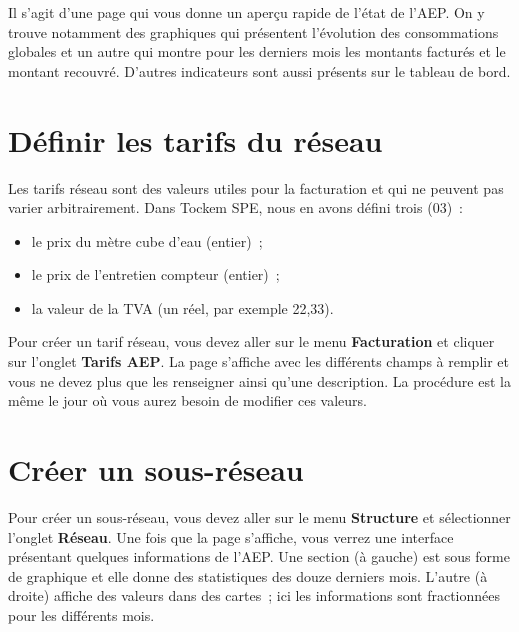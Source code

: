 Il s'agit d'une page qui vous donne un aperçu rapide de l'état de l'AEP. On y trouve notamment des graphiques qui présentent l'évolution des consommations globales et un autre qui montre pour les derniers mois les montants facturés et le montant recouvré. D'autres indicateurs sont aussi présents sur le tableau de bord.


\section{Définir les tarifs du réseau}

Les tarifs réseau sont des valeurs utiles pour la facturation et qui ne peuvent pas varier arbitrairement. Dans Tockem SPE, nous en avons défini trois (03)~:
\begin{itemize}
    \item le prix du mètre cube d'eau (entier)~;
    \item le prix de l'entretien compteur (entier)~;
    \item la valeur de la TVA (un réel, par exemple 22{,}33).
\end{itemize}

Pour créer un tarif réseau, vous devez aller sur le menu \textbf{Facturation} et cliquer sur l'onglet \textbf{Tarifs AEP}. La page s'affiche avec les différents champs à remplir et vous ne devez plus que les renseigner ainsi qu'une description. La procédure est la même le jour où vous aurez besoin de modifier ces valeurs.


\section{Créer un sous-réseau}

Pour créer un sous-réseau, vous devez aller sur le menu \textbf{Structure} et sélectionner l'onglet \textbf{Réseau}. Une fois que la page s'affiche, vous verrez une interface présentant quelques informations de l'AEP. Une section (à gauche) est sous forme de graphique et elle donne des statistiques des douze derniers mois. L'autre (à droite) affiche des valeurs dans des cartes~; ici les informations sont fractionnées pour les différents mois.

